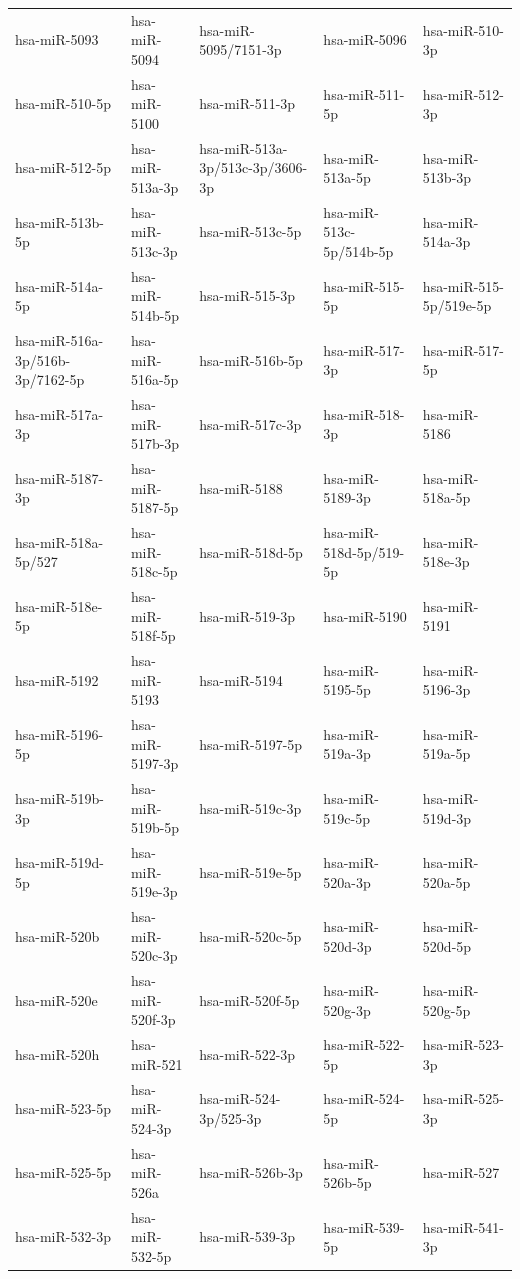 \begin{longtable}{lllll}
hsa-miR-5093 & hsa-miR-5094 & hsa-miR-5095/7151-3p & hsa-miR-5096 & hsa-miR-510-3p \\
hsa-miR-510-5p & hsa-miR-5100 & hsa-miR-511-3p & hsa-miR-511-5p & hsa-miR-512-3p \\
hsa-miR-512-5p & hsa-miR-513a-3p & hsa-miR-513a-3p/513c-3p/3606-3p & hsa-miR-513a-5p & hsa-miR-513b-3p \\
hsa-miR-513b-5p & hsa-miR-513c-3p & hsa-miR-513c-5p & hsa-miR-513c-5p/514b-5p & hsa-miR-514a-3p \\
hsa-miR-514a-5p & hsa-miR-514b-5p & hsa-miR-515-3p & hsa-miR-515-5p & hsa-miR-515-5p/519e-5p \\
hsa-miR-516a-3p/516b-3p/7162-5p & hsa-miR-516a-5p & hsa-miR-516b-5p & hsa-miR-517-3p & hsa-miR-517-5p \\
hsa-miR-517a-3p & hsa-miR-517b-3p & hsa-miR-517c-3p & hsa-miR-518-3p & hsa-miR-5186 \\
hsa-miR-5187-3p & hsa-miR-5187-5p & hsa-miR-5188 & hsa-miR-5189-3p & hsa-miR-518a-5p \\
hsa-miR-518a-5p/527 & hsa-miR-518c-5p & hsa-miR-518d-5p & hsa-miR-518d-5p/519-5p & hsa-miR-518e-3p \\
hsa-miR-518e-5p & hsa-miR-518f-5p & hsa-miR-519-3p & hsa-miR-5190 & hsa-miR-5191 \\
hsa-miR-5192 & hsa-miR-5193 & hsa-miR-5194 & hsa-miR-5195-5p & hsa-miR-5196-3p \\
hsa-miR-5196-5p & hsa-miR-5197-3p & hsa-miR-5197-5p & hsa-miR-519a-3p & hsa-miR-519a-5p \\
hsa-miR-519b-3p & hsa-miR-519b-5p & hsa-miR-519c-3p & hsa-miR-519c-5p & hsa-miR-519d-3p \\
hsa-miR-519d-5p & hsa-miR-519e-3p & hsa-miR-519e-5p & hsa-miR-520a-3p & hsa-miR-520a-5p \\
hsa-miR-520b & hsa-miR-520c-3p & hsa-miR-520c-5p & hsa-miR-520d-3p & hsa-miR-520d-5p \\
hsa-miR-520e & hsa-miR-520f-3p & hsa-miR-520f-5p & hsa-miR-520g-3p & hsa-miR-520g-5p \\
hsa-miR-520h & hsa-miR-521 & hsa-miR-522-3p & hsa-miR-522-5p & hsa-miR-523-3p \\
hsa-miR-523-5p & hsa-miR-524-3p & hsa-miR-524-3p/525-3p & hsa-miR-524-5p & hsa-miR-525-3p \\
hsa-miR-525-5p & hsa-miR-526a & hsa-miR-526b-3p & hsa-miR-526b-5p & hsa-miR-527 \\
hsa-miR-532-3p & hsa-miR-532-5p & hsa-miR-539-3p & hsa-miR-539-5p & hsa-miR-541-3p \\

\end{longtable}
